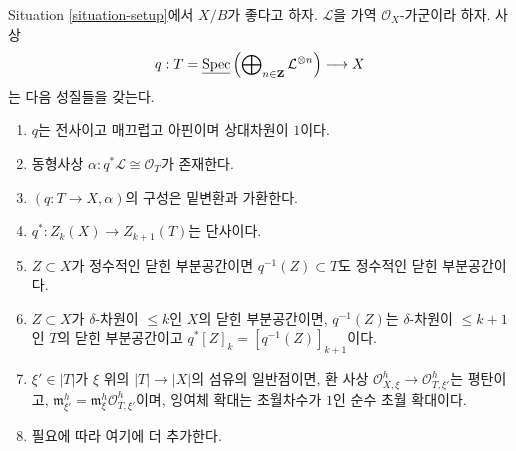 \begin{lemma}
\label{lemma-Gm-torsor}
Situation \ref{situation-setup}에서 $X/B$가 좋다고 하자.
$\mathcal{L}$을 가역 $\mathcal{O}_X$-가군이라 하자. 사상
$$
q :
T = \underline{\mathop{\mathrm{Spec}}}\left(
\bigoplus\nolimits_{n \in \mathbf{Z}} \mathcal{L}^{\otimes n}\right)
\longrightarrow
X
$$
는 다음 성질들을 갖는다.
\begin{enumerate}
\item $q$는 전사이고 매끄럽고 아핀이며 상대차원이 $1$이다.
\item 동형사상 $\alpha : q^*\mathcal{L} \cong \mathcal{O}_T$가 존재한다.
\item $(q : T \to X, \alpha)$의 구성은 밑변환과 가환한다.
\item $q^* : Z_k(X) \to Z_{k + 1}(T)$는 단사이다.
\item $Z \subset X$가 정수적인 닫힌 부분공간이면
$q^{-1}(Z) \subset T$도 정수적인 닫힌 부분공간이다.
\item $Z \subset X$가 $\delta$-차원이 $\leq k$인 $X$의 닫힌
부분공간이면, $q^{-1}(Z)$는 $\delta$-차원이 $\leq k + 1$인
$T$의 닫힌 부분공간이고
$q^*[Z]_k = [q^{-1}(Z)]_{k + 1}$이다.
\item $\xi' \in |T|$가 $\xi$ 위의 $|T| \to |X|$의 섬유의
일반점이면, 환 사상
$\mathcal{O}_{X, \xi}^h \to \mathcal{O}_{T, \xi'}^h$는 평탄이고,
$\mathfrak m_{\xi'}^h = \mathfrak m_\xi^h \mathcal{O}_{T, \xi'}^h$이며,
잉여체 확대는 초월차수가 $1$인 순수 초월 확대이다.
\item 필요에 따라 여기에 더 추가한다.
\end{enumerate}
\end{lemma}

